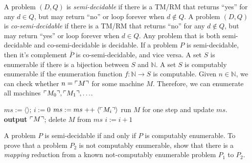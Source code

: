  A problem $(D,Q)$ is \emph{semi-decidable} if there is a TM/RM that returns ``yes'' for any $d \in Q$, but may return ``no'' or loop forever when $d \notin Q$.
 A problem $(D, Q)$ is \emph{co-semi-decidable} if there is a TM/RM that returns ``no'' for any $d \notin Q$, but may return ``yes'' or loop forever when $d \in Q$.
 Any problem that is both semi-decidable and co-semi-decidable is decidable.
 If a problem $P$ is semi-decidable, then it's complement $\bar{P}$ is co-semi-decidable, and vice versa.
 A set $S$ is enumerable if there is a bijection between $S$ and $\mathbb{N}$.
 A set $S$ is computably enumerable if the enumeration function $f: \mathbb{N} \to S$ is computable.
 Given $n \in \mathbb{N}$, we can check whether $n = \ulcorner M \urcorner$ for some machine $M$. Therefore, we can enumerate all machines $\ulcorner M_0 \urcorner,\ulcorner M_1 \urcorner,\ldots$.
\begin{algorithmic}
    \State $ms := \langle\rangle$; $i := 0$
        \State $ms := ms \mathrel{++} \langle\ulcorner M_i \urcorner\rangle$
            \State run $M$ for one step and update $ms$.
                \State \textbf{output} $\ulcorner M \urcorner$; delete $M$ from $ms$
            \EndIf
        \EndFor
        \State $i := i+1$
    \EndWhile
\end{algorithmic}
 A problem $P$ is semi-decidable if and only if $P$ is computably enumerable.
 To prove that a problem $P_2$ is not computably enumerable, show that there is a \emph{mapping} reduction from a known not-computably enumerable problem $P_1$ to $P_2$.
